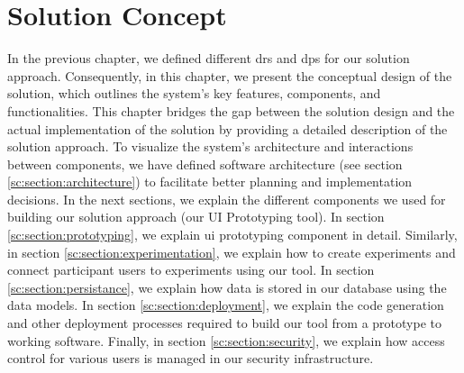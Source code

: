 
\chapter{Solution Concept}
\label{chap:concept}
\ifpdf
    \graphicspath{{Chapters/Solution-Concept/Figs/}{Chapters/Solution-Concept/Figs/}{Chapters/Solution-Concept/Figs/}}
\else
    \graphicspath{{Chapters/Solution-Concept/Figs/}{Chapters/Solution-Concept/Figs/}}
\fi
In the previous chapter, we defined different \ac{dr}s and \ac{dp}s for our solution approach. 
Consequently, in this chapter, we present the conceptual design of the solution, which outlines the system's key features, components, and functionalities. 
This chapter bridges the gap between the solution design and the actual implementation of the solution by providing a detailed description of the solution approach.
To visualize the system's architecture and interactions between components, we have defined software architecture (see section \ref{sc:section:architecture}) to facilitate better planning and implementation decisions.
In the next sections, we explain the different components we used for building our solution approach (our UI Prototyping tool). 
In section \ref{sc:section:prototyping}, we explain \ac{ui} prototyping component in detail. 
Similarly, in section \ref{sc:section:experimentation}, we explain how to create experiments and connect participant users to experiments using our tool.
In section \ref{sc:section:persistance}, we explain how data is stored in our database using the data models. 
In section \ref{sc:section:deployment}, we explain the code generation and other deployment processes required to build our tool from a prototype to working software.
Finally, in section \ref{sc:section:security}, we explain how access control for various users is managed in our security infrastructure.


